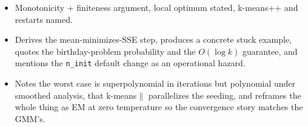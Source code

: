 \begin{interviewq}

\goodgreat
\begin{itemize}
    \item {} Monotonicity + finiteness argument, local optimum stated, k-means++ and restarts named.
    \item {} Derives the mean-minimizes-SSE step, produces a concrete stuck example, quotes the birthday-problem probability and the $O(\log k)$ guarantee, and mentions the \texttt{n\_init} default change as an operational hazard.
    \item {} Notes the worst case is superpolynomial in iterations but polynomial under smoothed analysis, that k-means$\|$ parallelizes the seeding, and reframes the whole thing as EM at zero temperature so the convergence story matches the GMM's.
\end{itemize}

\end{interviewq}

